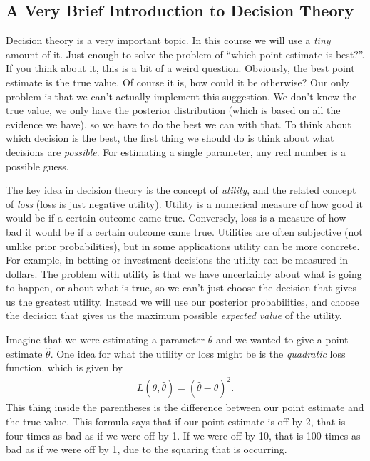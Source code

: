 \subsection{A Very Brief Introduction to Decision Theory}
Decision theory is a very important topic. In this course we will use a
{\it tiny} amount of it. Just enough to solve the problem of ``which point
estimate is best?''. If you think about it, this is a bit of a weird question.
Obviously, the best point estimate is the true value. Of course it is, how could it
be otherwise? Our only problem is that we can't actually implement this suggestion.
We don't know the true value, we only have the posterior distribution
(which is based on all the evidence we have), so we have to do 
the best we can with that. To think about which decision is the best,
the first thing we should do is think
about what decisions are {\it possible}. For estimating a single parameter, any
real number is a possible guess.

The key idea in decision theory is the concept of {\it utility}, and the related
concept of {\it loss} (loss is just negative utility). Utility is
a numerical measure of how good it would be if a certain outcome came true.
Conversely, loss is a measure of how bad it would be if a certain outcome
came true.
Utilities are often subjective (not unlike prior probabilities), but in some
applications utility can be more concrete. For example, in betting or investment
decisions the utility can be measured in dollars. The problem with utility is
that we have uncertainty about what is going to happen, or about what is true,
so we can't just choose the decision that gives us the greatest utility. Instead
we will use our posterior probabilities, and choose the decision that gives us
the maximum possible {\it expected value} of the utility.

Imagine that we were estimating a parameter $\theta$ and we wanted to give a
point estimate $\hat{\theta}$. One idea for what the utility or loss might be is the
{\it quadratic} loss function, which is given by
\begin{eqnarray}
L(\theta, \hat{\theta}) = \left(\hat{\theta} - \theta\right)^2.
\end{eqnarray}
This thing inside the parentheses is the difference between our point estimate
and the true value. This formula says that if our point estimate is off by 2,
that is four times as bad as if we were off by 1. If we were off by 10, that is
100 times as bad as if we were off by 1, due to the squaring that is occurring.


